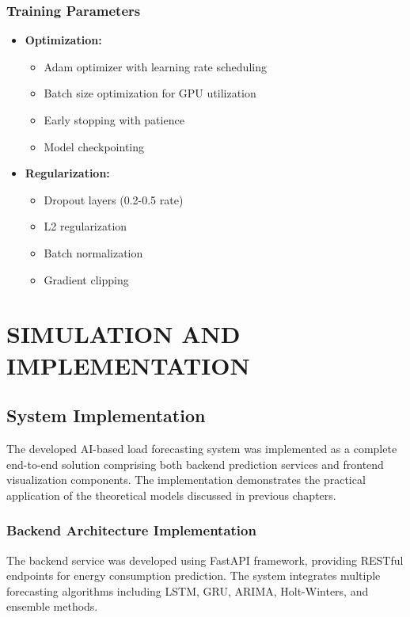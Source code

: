 \documentclass[12pt,a4paper]{report}
\begin{document}
\subsection{Training Parameters}
\begin{itemize}
\item \textbf{Optimization:}
  \begin{itemize}
    \item Adam optimizer with learning rate scheduling
    \item Batch size optimization for GPU utilization
    \item Early stopping with patience
    \item Model checkpointing
  \end{itemize}

\item \textbf{Regularization:}
  \begin{itemize}
    \item Dropout layers (0.2-0.5 rate)
    \item L2 regularization
    \item Batch normalization
    \item Gradient clipping
  \end{itemize}
\end{itemize}




\chapter{SIMULATION AND IMPLEMENTATION}
\section{System Implementation}
The developed AI-based load forecasting system was implemented as a complete end-to-end solution comprising both backend prediction services and frontend visualization components. The implementation demonstrates the practical application of the theoretical models discussed in previous chapters.

\subsection{Backend Architecture Implementation}
The backend service was developed using FastAPI framework, providing RESTful endpoints for energy consumption prediction. The system integrates multiple forecasting algorithms including LSTM, GRU, ARIMA, Holt-Winters, and ensemble methods.
\end{document}
